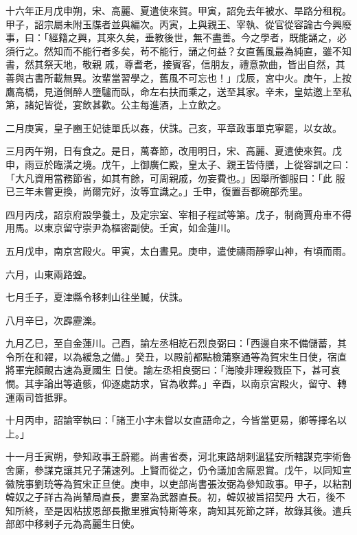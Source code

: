\begin{pinyinscope}
 十六年正月戊申朔，宋、高麗、夏遣使來賀。甲寅，詔免去年被水、旱路分租稅。甲子，詔宗屬未附玉牒者並與編次。丙寅，上與親王、宰執、從官從容論古今興廢事，曰：「經籍之興，其來久矣，垂教後世，無不盡善。今之學者，既能誦之，必須行之。然知而不能行者多矣，茍不能行，誦之何益？女直舊風最為純直，雖不知書，然其祭天地，敬親
 戚，尊耆老，接賓客，信朋友，禮意款曲，皆出自然，其善與古書所載無異。汝輩當習學之，舊風不可忘也！」戊辰，宮中火。庚午，上按鷹高橋，見道側醉人墮驢而臥，命左右扶而乘之，送至其家。辛未，皇姑邀上至私第，諸妃皆從，宴飲甚歡。公主每進酒，上立飲之。



 二月庚寅，皇子豳王妃徒單氏以姦，伏誅。己亥，平章政事單克寧罷，以女故。



 三月丙午朔，日有食之。是日，萬春節，改用明日，宋、高麗、夏遣使來賀。戊申，雨豆於臨潢之境。戊午，上御廣仁殿，皇太子、親王皆侍膳，上從容訓之曰：「大凡資用當務節省，如其有餘，可周親戚，勿妄費也。」因舉所御服曰：「此
 服已三年未嘗更換，尚爾完好，汝等宜識之。」壬申，復置吾都碗部禿里。



 四月丙戌，詔京府設學養土，及定宗室、宰相子程試等第。戊子，制商賈舟車不得用馬。以東京留守崇尹為樞密副使。壬寅，如金蓮川。



 五月戊申，南京宮殿火。甲寅，太白晝見。庚申，遣使禱雨靜寧山神，有頃而雨。



 六月，山東兩路蝗。



 七月壬子，夏津縣令移剌山往坐贓，伏誅。



 八月辛巳，次霹靂濼。



 九月乙巳，至自金蓮川。己酉，諭左丞相紇石烈良弼曰：「西邊自來不備儲蓄，其令所在和糴，以為緩急之備。」癸丑，以殿前都點檢蒲察通等為賀宋生日使，宿直將軍完顏覿古速為夏國生
 日使。諭左丞相良弼曰：「海陵非理殺戮臣下，甚可哀憫。其孛論出等遺骸，仰逐處訪求，官為收葬。」辛酉，以南京宮殿火，留守、轉運兩司皆抵罪。



 十月丙申，詔諭宰執曰：「諸王小字未嘗以女直語命之，今皆當更易，卿等擇名以上。」



 十一月壬寅朔，參知政事王蔚罷。尚書省奏，河北東路胡剌溫猛安所轄謀克孛術魯舍廝，參謀克讓其兄子蒲速列。上賢而從之，仍令議加舍廝恩賞。戊午，以同知宣徽院事劉珫等為賀宋正旦使。庚申，以吏部尚書張汝弼為參知政事。甲子，以粘割韓奴之子詳古為尚輦局直長，婁室為武器直長。初，韓奴被旨招契丹
 大石，後不知所終，至是因粘拔恩部長撒里雅寅特斯等來，詢知其死節之詳，故錄其後。遣兵部郎中移剌子元為高麗生日使。




\end{pinyinscope}
